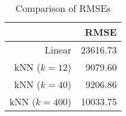 \begin{table}[ht]
\centering
\begin{tabular}{rr}
  \hline
 & RMSE \\ 
  \hline
Linear & 23616.73 \\ 
  kNN ($k=12$) & 9079.60 \\ 
  kNN ($k=40$) & 9206.86 \\ 
  kNN ($k=400$) & 10033.75 \\ 
   \hline
\end{tabular}
\caption{Comparison of RMSEs} 
\label{tab:rmse_compare}
\end{table}
